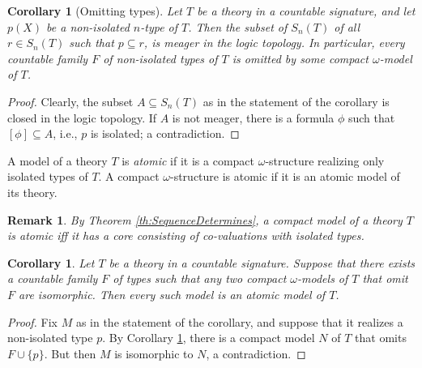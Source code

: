 \documentclass[12pt]{amsart}
\theoremstyle{plain}
\newtheorem{corollary}[theorem]{\bf Corollary}
\newtheorem{remark}[theorem]{\bf Remark}
\newtheorem{proposition}[theorem]{\bf Proposition}
\newcommand \Th{{\rm{ Th}}}
\begin{document}
\begin{corollary}[Omitting types]
	\label{co:OM}
		Let $T$ be a theory in a countable signature, and let $p(X)$ be a non-isolated $n$-type of $T$. Then the subset of $S_n(T)$ of all $r \in S_n(T)$ such that $p \subseteq r$, is meager in the logic topology. In particular, every countable family $F$ of non-isolated types of $T$ is omitted by some compact $\omega$-model of $T$. 
	\end{corollary}
	
\begin{proof}
Clearly, the subset $A \subseteq S_n(T)$ as in the statement of the corollary is closed in the logic topology. If $A$ is not meager, there is a formula $\phi$ such that $[\phi] \subseteq A$, i.e., $p$ is isolated; a contradiction.
\end{proof}
	
A model of a theory $T$ is \emph{atomic} if it is a compact $\omega$-structure realizing only isolated types of $T$. A compact $\omega$-structure is atomic if it is an atomic model of its theory. 

\begin{remark}
\label{re:CoreAtomicIsAtomic}
By Theorem \ref{th:SequenceDetermines}, a compact model of a theory $T$ is atomic iff it has a core consisting of co-valuations with isolated types.  
\end{remark}	

\begin{corollary}
\label{co:MiniSuzuki}
Let $T$ be a theory in a countable signature. Suppose that there exists a countable family $F$ of types such that any two compact $\omega$-models of $T$ that omit $F$  are isomorphic. Then every such model is an atomic model of $T$.
\end{corollary}

\begin{proof}
Fix $M$ as in the statement of the corollary, and suppose that it realizes a non-isolated type $p$. By Corollary \ref{co:OM}, there is a compact model $N$ of $T$ that omits $F \cup \{p\}$. But then $M$ is isomorphic to $N$, a contradiction.
\end{proof}


	
	
	
\end{document}
